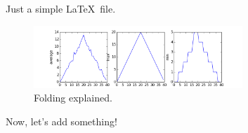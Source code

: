 \documentclass[preprint,showpacs,nofootinbib,floatfix]{revtex4-1}
\begin{document}
Just a simple \LaTeX\ file.


\vspace*{-5pt}
\begin{figure}[h!]
\includegraphics[width=0.70\textwidth]{plot.png}
\vspace*{-5pt}
\caption{Folding explained.}
\label{fig_folding} 
\end{figure} 


Now, let's add something!
\end{document}

